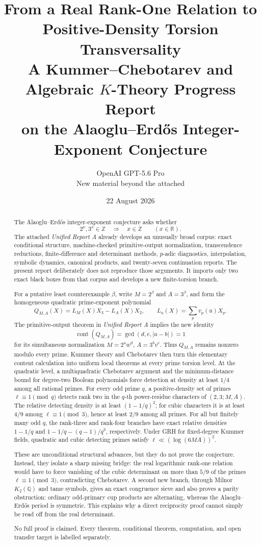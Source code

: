 \documentclass[11pt]{article}
\title{\vspace{-1.6cm}\textbf{From a Real Rank-One Relation to Positive-Density Torsion Transversality}\\[0.35em]
\Large A Kummer--Chebotarev and Algebraic \(K\)-Theory Progress Report\\
\large on the Alaoglu--Erd\H{o}s Integer-Exponent Conjecture}
\author{OpenAI GPT-5.6 Pro\\
\small New material beyond the attached \ReportA}
\date{22 August 2026}
\numberwithin{equation}{section}
\theoremstyle{definition}
\theoremstyle{remark}
\newcommand{\Q}{\mathbb Q}
\newcommand{\Z}{\mathbb Z}
\newcommand{\cont}{\operatorname{cont}}
\newcommand{\ReportA}{\textit{Unified Report A}}
\begin{document}
\maketitle

\begin{abstract}
The Alaoglu--Erd\H{o}s integer-exponent conjecture asks whether
\[
 2^x,3^x\in\Z \quad\Longrightarrow\quad x\in\Z
 \qquad (x\in\mathbb R).
\]
The attached \ReportA{} already develops an unusually broad corpus: exact conditional
structure, machine-checked primitive-output normalization, transcendence reductions,
finite-difference and determinant methods, \(p\)-adic diagnostics, interpolation,
symbolic dynamics, canonical products, and twenty-seven continuation reports.  The present
report deliberately does not reproduce those arguments.  It imports only two exact black
boxes from that corpus and develops a new finite-torsion branch.

For a putative least counterexample \(\beta\), write \(M=2^\beta\) and \(A=3^\beta\), and
form the homogeneous quadratic prime-exponent polynomial
\[
 Q_{M,A}(X)=L_M(X)X_3-L_A(X)X_2,
 \qquad L_u(X)=\sum_p v_p(u)X_p.
\]
The primitive-output theorem in \ReportA{} implies the new identity
\[
 \cont(Q_{M,A})=\gcd(d,e,|a-b|)=1
\]
for its simultaneous normalization \(M=2^aw^d\), \(A=3^bv^e\).  Thus \(Q_{M,A}\) remains
nonzero modulo every prime.  Kummer theory and Chebotarev then turn this elementary content
calculation into uniform local theorems at every prime torsion level.  At the quadratic level,
a multiquadratic Chebotarev argument and the minimum-distance bound for degree-two Boolean
polynomials force detection at density at least \(1/4\) among all rational primes.  For every
odd prime \(q\), a positive-density set of primes \(\ell\equiv1\pmod q\) detects rank two in
the \(q\)-th power-residue characters of \((2,3;M,A)\).  The relative detecting density is at
least \((1-1/q)^2\); for cubic characters it is at least \(4/9\) among
\(\ell\equiv1\pmod3\), hence at least \(2/9\) among all primes.  For all but finitely many
odd \(q\), the rank-three and rank-four branches have exact relative densities
\(1-1/q\) and \(1-1/q-(q-1)/q^3\), respectively.  Under GRH for fixed-degree Kummer
fields, quadratic and cubic detecting primes satisfy \(\ell\ll(\log(6MA))^2\).

These are unconditional structural advances, but they do not prove the conjecture.  Instead,
they isolate a sharp missing bridge: the real logarithmic rank-one relation would have to force
vanishing of the cubic determinant on more than \(5/9\) of the primes
\(\ell\equiv1\pmod3\), contradicting Chebotarev.  A second new branch, through Milnor
\(K_2(\Q)\) and tame symbols, gives an exact congruence sieve and also proves a parity
obstruction: ordinary odd-primary cup products are alternating, whereas the Alaoglu--Erd\H{o}s
period is symmetric.  This explains why a direct reciprocity proof cannot simply be read off
from the real determinant.

No full proof is claimed.  Every theorem, conditional theorem, computation, and open transfer
target is labelled separately.
\end{abstract}
\end{document}
